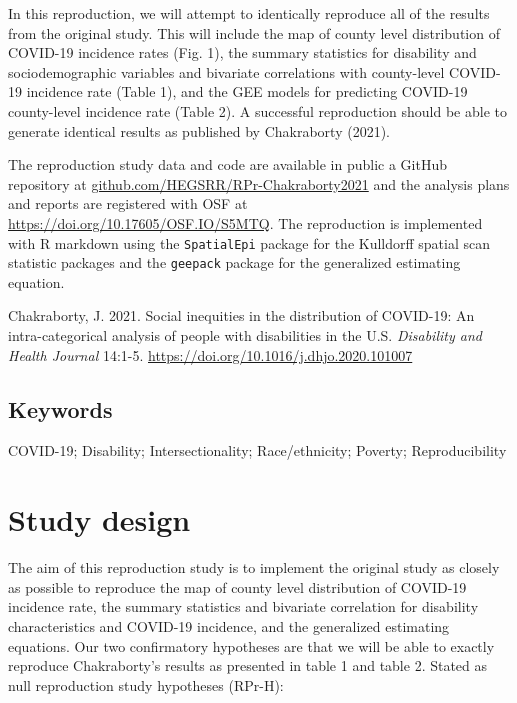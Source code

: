 \documentclass[
]{article}
\begin{document}
In this reproduction, we will attempt to identically reproduce all of
the results from the original study. This will include the map of county
level distribution of COVID-19 incidence rates (Fig. 1), the summary
statistics for disability and sociodemographic variables and bivariate
correlations with county-level COVID-19 incidence rate (Table 1), and
the GEE models for predicting COVID-19 county-level incidence rate
(Table 2). A successful reproduction should be able to generate
identical results as published by Chakraborty (2021).

The reproduction study data and code are available in public a GitHub
repository at
\href{https://github.com/HEGSRR/RPr-Chakraborty2021}{github.com/HEGSRR/RPr-Chakraborty2021}
and the analysis plans and reports are registered with OSF at
\url{https://doi.org/10.17605/OSF.IO/S5MTQ}. The reproduction is
implemented with R markdown using the \texttt{SpatialEpi} package for
the Kulldorff spatial scan statistic packages and the \texttt{geepack}
package for the generalized estimating equation.

Chakraborty, J. 2021. Social inequities in the distribution of COVID-19:
An intra-categorical analysis of people with disabilities in the U.S.
\emph{Disability and Health Journal} 14:1-5.
\url{https://doi.org/10.1016/j.dhjo.2020.101007}

\hypertarget{keywords}{%
\subsection{Keywords}\label{keywords}}

COVID-19; Disability; Intersectionality; Race/ethnicity; Poverty;
Reproducibility

\hypertarget{study-design}{%
\section{Study design}\label{study-design}}

The aim of this reproduction study is to implement the original study as
closely as possible to reproduce the map of county level distribution of
COVID-19 incidence rate, the summary statistics and bivariate
correlation for disability characteristics and COVID-19 incidence, and
the generalized estimating equations. Our two confirmatory hypotheses
are that we will be able to exactly reproduce Chakraborty's results as
presented in table 1 and table 2. Stated as null reproduction study
hypotheses (RPr-H):
\end{document}
